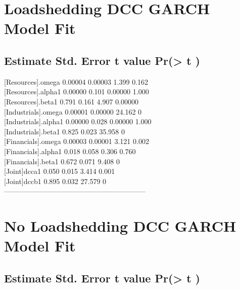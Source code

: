 \documentclass[11pt,preprint, authoryear]{elsarticle}
\numberwithin{equation}{section}
\numberwithin{figure}{section}
\numberwithin{table}{section}
\begin{document}
\hypertarget{loadshedding-dcc-garch-model-fit}{%
\section{Loadshedding DCC GARCH Model
Fit}\label{loadshedding-dcc-garch-model-fit}}

\hypertarget{estimate-std.-error-t-value-pr-t-1}{%
\subsection{Estimate Std. Error t value Pr(\textgreater{} \textbar{}
t\textbar{} )}\label{estimate-std.-error-t-value-pr-t-1}}

{[}Resources{]}.omega 0.00004 0.00003 1.399 0.162\\
{[}Resources{]}.alpha1 0.00000 0.101 0.00000 1.000\\
{[}Resources{]}.beta1 0.791 0.161 4.907 0.00000\\
{[}Industrials{]}.omega 0.00001 0.00000 24.162 0\\
{[}Industrials{]}.alpha1 0.00000 0.028 0.00000 1.000\\
{[}Industrials{]}.beta1 0.825 0.023 35.958 0\\
{[}Financials{]}.omega 0.00003 0.00001 3.121 0.002\\
{[}Financials{]}.alpha1 0.018 0.058 0.306 0.760\\
{[}Financials{]}.beta1 0.672 0.071 9.408 0\\
{[}Joint{]}dcca1 0.050 0.015 3.414 0.001\\
{[}Joint{]}dccb1 0.895 0.032 27.579 0\\
------------------------------------------------------------

\hypertarget{no-loadshedding-dcc-garch-model-fit}{%
\section{No Loadshedding DCC GARCH Model
Fit}\label{no-loadshedding-dcc-garch-model-fit}}

\hypertarget{estimate-std.-error-t-value-pr-t-2}{%
\subsection{Estimate Std. Error t value Pr(\textgreater{} \textbar{}
t\textbar{} )}\label{estimate-std.-error-t-value-pr-t-2}}
\end{document}
